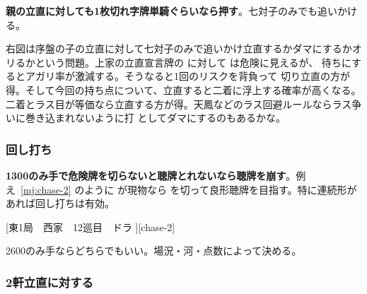 \documentclass[../nankiru_main.tex]{subfiles}
\begin{document}
\begin{minipage}[t][6.5cm]{\textwidth}
  \begin{figure}\vspace{-1.5\topskip}
  \end{figure}
  
  \textbf{親の立直に対しても1枚切れ字牌単騎ぐらいなら押す}\citep[][pp.~133--134]{miinin-choice}。七対子のみでも追いかける\footnotemark。

  右図は序盤の子の立直に対して七対子のみで追いかけ立直するかダマにするかオリるかという問題。上家の立直宣言牌の  に対して  は危険に見えるが、 待ちにするとアガリ率が激減する。そうなると1回のリスクを背負って  切り立直の方が得。そして今回の持ち点について、立直すると二着に浮上する確率が高くなる。二着とラス目が等価なら立直する方が得。天鳳などのラス回避ルールならラス争いに巻き込まれないように打  としてダマにするのもあるかな\citep[][pp.~190--191, p.~221]{fkt}。
\end{minipage}


\subsubsection*{回し打ち}

\textbf{1300のみ手で危険牌を切らないと聴牌とれないなら聴牌を崩す}\citep[][pp.~137--138]{miinin-choice}。例え~\ref{mj:chase-2} のように  が現物なら  を切って良形聴牌を目指す。特に連続形があれば回し打ちは有効。

[東1局　西家　12巡目　ドラ ][chase-2]

2600のみ手ならどちらでもいい。場況・河・点数によって決める。


\subsubsection*{2軒立直に対する}
\end{document}
